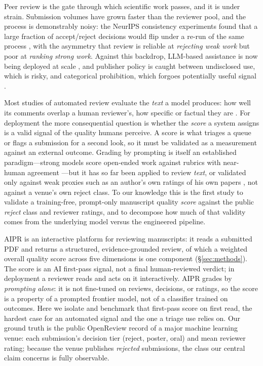 Peer review is the gate through which scientific work passes, and it is under strain.
Submission volumes have grown faster than the reviewer pool, and the process is
demonstrably noisy: the NeurIPS consistency experiments found that a large fraction of
accept/reject decisions would flip under a re-run of the same process
\citep{cortes2021inconsistency,beygelzimer2023arbitrary}, with the asymmetry that review is
reliable at \emph{rejecting weak work} but poor at \emph{ranking strong work}. Against this
backdrop, LLM-based assistance is now being deployed at scale
\citep{thakkar2026feedback,biswas2026aaai}, and publisher policy is caught between
undisclosed use, which is risky, and categorical prohibition, which forgoes potentially
useful signal \citep{science2025funding}.

Most studies of automated review evaluate the \emph{text} a model produces: how well its
comments overlap a human reviewer's, how specific or factual they are
\citep{liang2024llm,darcy2024marg,yuan2022automate,du2024llmsassist}. For deployment the
more consequential question is whether the \emph{score} a system assigns is a valid signal
of the quality humans perceive. A score is what triages a queue or flags a submission for a
second look, so it must be validated as a measurement against an external outcome. Grading
by prompting is itself an established paradigm---strong models score open-ended work against
rubrics with near-human agreement \citep{zheng2023judging,liu2023geval,mizumoto2023exploring}---but
it has so far been applied to review \emph{text}, or validated only against weak proxies
such as an author's own ratings of his own papers \citep{thelwall2024chatgpt}, not against a
venue's own reject class. To our knowledge this is the first study to validate a
training-free, prompt-only manuscript quality \emph{score} against the public \emph{reject}
class and reviewer ratings, and to decompose how much of that validity comes from the
underlying model versus the engineered pipeline.

\textsc{AIPR} is an interactive platform for reviewing manuscripts: it reads a submitted
PDF and returns a structured, evidence-grounded review, of which a weighted overall quality
score across five dimensions is one component (\S\ref{sec:methods}). The score is an AI
first-pass signal, not a final human-reviewed verdict; in deployment a reviewer reads and
acts on it interactively. AIPR grades by \emph{prompting alone}: it is not fine-tuned on
reviews, decisions, or ratings, so the score is a property of a prompted frontier model, not
of a classifier trained on outcomes. Here we isolate and benchmark that first-pass score on
first read, the hardest case for an automated signal and the one a triage use relies on. Our
ground truth is the public OpenReview record of a major machine learning venue: each
submission's decision tier (reject, poster, oral) and mean reviewer rating; because the venue
publishes \emph{rejected} submissions, the class our central claim concerns is fully
observable.

